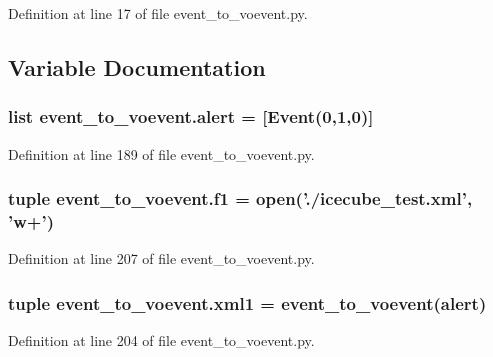 Definition at line 17 of file event\-\_\-to\-\_\-voevent.\-py.



\subsection{Variable Documentation}
\hypertarget{namespaceevent__to__voevent_a03ee0e3ec3e47ff328b577664ff21746}{
\subsubsection[{alert}]{\setlength{\rightskip}{0pt plus 5cm}list event\-\_\-to\-\_\-voevent.\-alert = \mbox{[}Event(0,1,0)\mbox{]}}}\label{namespaceevent__to__voevent_a03ee0e3ec3e47ff328b577664ff21746}


Definition at line 189 of file event\-\_\-to\-\_\-voevent.\-py.

\hypertarget{namespaceevent__to__voevent_a9cee57fced845b4f9ad3e6483d64361d}{
\subsubsection[{f1}]{\setlength{\rightskip}{0pt plus 5cm}tuple event\-\_\-to\-\_\-voevent.\-f1 = open('./icecube\-\_\-test.\-xml', 'w+')}}\label{namespaceevent__to__voevent_a9cee57fced845b4f9ad3e6483d64361d}


Definition at line 207 of file event\-\_\-to\-\_\-voevent.\-py.

\hypertarget{namespaceevent__to__voevent_a2d9d3e362b21381b1c809aa09d3cdb9d}{
\subsubsection[{xml1}]{\setlength{\rightskip}{0pt plus 5cm}tuple event\-\_\-to\-\_\-voevent.\-xml1 = {\bf event\-\_\-to\-\_\-voevent}({\bf alert})}}\label{namespaceevent__to__voevent_a2d9d3e362b21381b1c809aa09d3cdb9d}


Definition at line 204 of file event\-\_\-to\-\_\-voevent.\-py.

